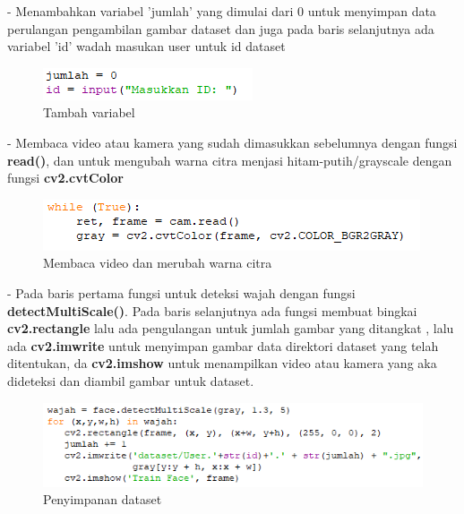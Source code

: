 \begin{enumerate}[1.]
- Menambahkan variabel 'jumlah' yang dimulai dari 0 untuk menyimpan data perulangan pengambilan gambar dataset
dan juga pada baris selanjutnya ada variabel 'id' wadah masukan user untuk id dataset
\begin{figure}[h!]
    \centering
    \includegraphics[width=0.5\linewidth]{images/fr_3.PNG}
    \caption{Tambah variabel}
\end{figure}
\newpage
- Membaca video atau kamera yang sudah dimasukkan sebelumnya dengan fungsi \textbf{read()}, dan untuk mengubah warna citra menjasi hitam-putih/grayscale
dengan fungsi \textbf{cv2.cvtColor}
\begin{figure}[h!]
    \centering
    \includegraphics[width=0.85\linewidth]{images/fr_4.PNG}
    \caption{Membaca video dan merubah warna citra}
\end{figure}

- Pada baris pertama fungsi untuk deteksi wajah dengan fungsi \textbf{detectMultiScale()}. 
Pada baris selanjutnya ada fungsi membuat bingkai \textbf{cv2.rectangle} lalu ada pengulangan untuk jumlah gambar yang ditangkat
, lalu ada \textbf{cv2.imwrite} untuk menyimpan gambar data direktori dataset yang telah ditentukan, da \textbf{cv2.imshow} untuk 
menampilkan video atau kamera yang aka dideteksi dan diambil gambar untuk dataset.
\begin{figure}[h!]
    \centering
    \includegraphics[width=0.85\linewidth]{images/fr_5.PNG}
    \caption{Penyimpanan dataset}
\end{figure}


\end{enumerate}
